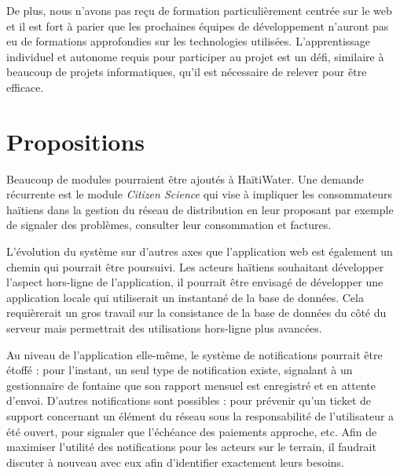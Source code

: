 \documentclass{EPL-master-thesis-covers-FR}
\begin{document}

			De plus, nous n'avons pas reçu de formation particulièrement centrée sur le web et il est fort à parier que les prochaines équipes de développement n'auront pas eu de formations approfondies sur les technologies utilisées. L'apprentissage individuel et autonome requis pour participer au projet est un défi, similaire à beaucoup de projets informatiques, qu'il est nécessaire de relever pour être efficace.

		\section{Propositions}

			Beaucoup de modules pourraient être ajoutés à HaïtiWater. Une demande récurrente est le module \emph{Citizen Science} qui vise à impliquer les consommateurs haïtiens dans la gestion du réseau de distribution en leur proposant par exemple de signaler des problèmes, consulter leur consommation et factures.

			L'évolution du système sur d'autres axes que l'application web est également un chemin qui pourrait être poursuivi. Les acteurs haïtiens souhaitant développer l'aspect hors-ligne de l'application, il pourrait être envisagé de développer une application locale qui utiliserait un instantané de la base de données. Cela requièrerait un gros travail sur la consistance de la base de données du côté du serveur mais permettrait des utilisations hors-ligne plus avancées.

			Au niveau de l'application elle-même, le système de notifications pourrait être étoffé : pour l'instant, un seul type de notification existe, signalant à un gestionnaire de fontaine que son rapport mensuel est enregistré et en attente d'envoi. D'autres notifications sont possibles : pour prévenir qu'un ticket de support concernant un élément du réseau sous la responsabilité de l'utilisateur a été ouvert, pour signaler que l'échéance des paiements approche, etc. Afin de maximiser l'utilité des notifications pour les acteurs sur le terrain, il faudrait discuter à nouveau avec eux afin d'identifier exactement leurs besoins.
\end{document}
